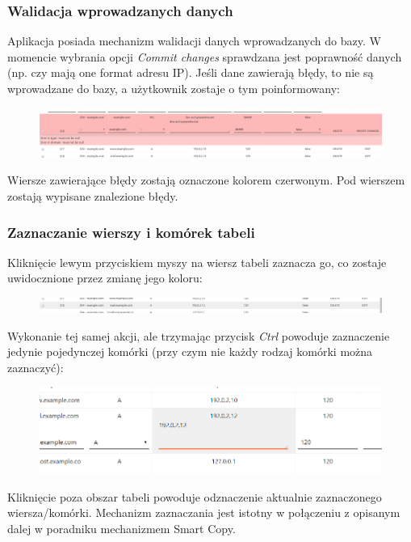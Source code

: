 \documentclass[12pt] {article}
\begin{document}
\subsubsection{Walidacja wprowadzanych danych}
Aplikacja posiada mechanizm walidacji danych wprowadzanych do bazy. W momencie wybrania opcji \emph{Commit changes} sprawdzana jest poprawność danych (np. czy mają one format adresu IP). Jeśli dane zawierają błędy, to nie są wprowadzane do bazy, a użytkownik zostaje o tym poinformowany:
\begin{figure}[H]
\centering
\includegraphics[width=\textwidth]{res/x_tabela_niepoprawny}
\end{figure}
Wiersze zawierające błędy zostają oznaczone kolorem czerwonym. Pod wierszem zostają wypisane znalezione błędy. 

\subsubsection{Zaznaczanie wierszy i komórek tabeli}
Kliknięcie lewym przyciskiem myszy na wiersz tabeli zaznacza go, co zostaje uwidocznione przez zmianę jego koloru:
\begin{figure}[H]
\centering
\includegraphics[width=\textwidth]{res/x_tabela_zaznaczenie_wiersz}
\end{figure}
Wykonanie tej samej akcji, ale trzymając przycisk \emph{Ctrl} powoduje zaznaczenie jedynie pojedynczej komórki (przy czym nie każdy rodzaj komórki można zaznaczyć):
\begin{figure}[H]
\centering
\includegraphics[width=\textwidth]{res/x_tabela_zaznaczenie_pojedyncze}
\end{figure}
Kliknięcie poza obszar tabeli powoduje odznaczenie aktualnie zaznaczonego wiersza/komórki.
Mechanizm zaznaczania jest istotny w połączeniu z opisanym dalej w poradniku mechanizmem Smart Copy. 
\end{document}
